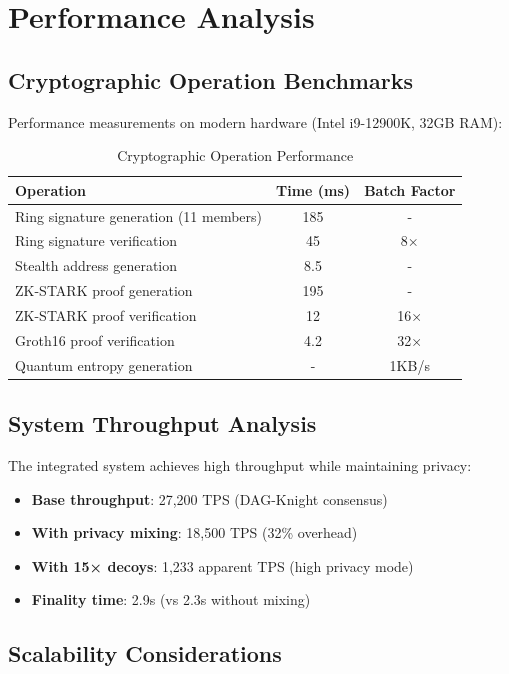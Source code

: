 \documentclass[12pt,a4paper]{article}
\begin{document}
\section{Performance Analysis}

\subsection{Cryptographic Operation Benchmarks}

Performance measurements on modern hardware (Intel i9-12900K, 32GB RAM):

\begin{table}[h]
\centering
\begin{tabular}{lcc}
\toprule
Operation & Time (ms) & Batch Factor \\
\midrule
Ring signature generation (11 members) & 185 & - \\
Ring signature verification & 45 & 8× \\
Stealth address generation & 8.5 & - \\
ZK-STARK proof generation & 195 & - \\
ZK-STARK proof verification & 12 & 16× \\
Groth16 proof verification & 4.2 & 32× \\
Quantum entropy generation & - & 1KB/s \\
\bottomrule
\end{tabular}
\caption{Cryptographic Operation Performance}
\end{table}

\subsection{System Throughput Analysis}

The integrated system achieves high throughput while maintaining privacy:

\begin{itemize}
\item \textbf{Base throughput}: 27,200 TPS (DAG-Knight consensus)
\item \textbf{With privacy mixing}: 18,500 TPS (32\% overhead)
\item \textbf{With 15× decoys}: 1,233 apparent TPS (high privacy mode)
\item \textbf{Finality time}: 2.9s (vs 2.3s without mixing)
\end{itemize}

\subsection{Scalability Considerations}
\end{document}
